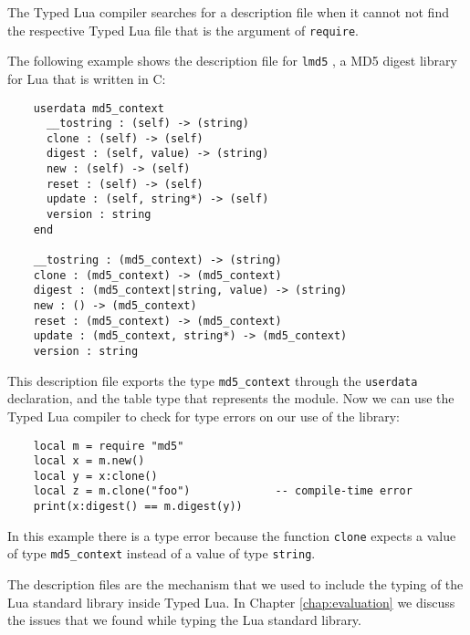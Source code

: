The Typed Lua compiler searches for a description file when it cannot
not find the respective Typed Lua file that is the argument of
\texttt{require}.

The following example shows the description file for \texttt{lmd5} \citep{lmd5},
a MD5 digest library for Lua that is written in C:
\begin{verbatim}
    userdata md5_context
      __tostring : (self) -> (string)
      clone : (self) -> (self)
      digest : (self, value) -> (string)
      new : (self) -> (self)
      reset : (self) -> (self)
      update : (self, string*) -> (self)
      version : string
    end

    __tostring : (md5_context) -> (string)
    clone : (md5_context) -> (md5_context)
    digest : (md5_context|string, value) -> (string)
    new : () -> (md5_context)
    reset : (md5_context) -> (md5_context)
    update : (md5_context, string*) -> (md5_context)
    version : string
\end{verbatim}

This description file exports the type \texttt{md5\string_context}
through the \texttt{userdata} declaration, and the table type
that represents the module.
Now we can use the Typed Lua compiler to check for type errors on
our use of the library:
\begin{verbatim}
    local m = require "md5"
    local x = m.new()
    local y = x:clone()
    local z = m.clone("foo")             -- compile-time error
    print(x:digest() == m.digest(y))
\end{verbatim}

In this example there is a type error because the function \texttt{clone}
expects a value of type \texttt{md5\string_context} instead of a value
of type \texttt{string}.

The description files are the mechanism that we used to include the
typing of the Lua standard library inside Typed Lua.
In Chapter \ref{chap:evaluation} we discuss the issues that we found
while typing the Lua standard library. 

